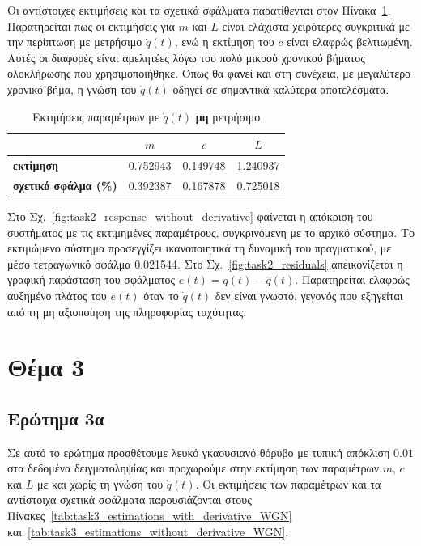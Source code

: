\documentclass[a4paper,12pt]{article}
\begin{document}
Οι αντίστοιχες εκτιμήσεις και τα σχετικά σφάλματα παρατίθενται στον Πίνακα~\ref{tab:task2_estimations_without_derivative}. Παρατηρείται πως οι εκτιμήσεις για $m$ και $L$ είναι ελάχιστα χειρότερες συγκριτικά με την περίπτωση με μετρήσιμο $\dot{q}(t)$, ενώ η εκτίμηση του $c$ είναι ελαφρώς βελτιωμένη. Αυτές οι διαφορές είναι αμελητέες λόγω του πολύ μικρού χρονικού βήματος ολοκλήρωσης που χρησιμοποιήθηκε. Όπως θα φανεί και στη συνέχεια, με μεγαλύτερο χρονικό βήμα, η γνώση του $\dot{q}(t)$ οδηγεί σε σημαντικά καλύτερα αποτελέσματα.

\begin{table}[h!]
\centering
\begin{tabular}{|l|c|c|c|}
\hline
\multicolumn{1}{|c|}{} & \multicolumn{1}{c|}{$m$} & \multicolumn{1}{c|}{$c$} & \multicolumn{1}{c|}{$L$} \\
\hline
\textbf{εκτίμηση} & 0.752943 & 0.149748 & 1.240937 \\
\textbf{σχετικό σφάλμα (\%)} & 0.392387 & 0.167878 & 0.725018 \\
\hline
\end{tabular}
\caption{Εκτιμήσεις παραμέτρων με $\dot{q}(t)$ \textbf{μη} μετρήσιμο}
\label{tab:task2_estimations_without_derivative}
\end{table}

Στο Σχ.~\ref{fig:task2_response_without_derivative} φαίνεται η απόκριση του συστήματος με τις εκτιμημένες παραμέτρους, συγκρινόμενη με το αρχικό σύστημα. Το εκτιμώμενο σύστημα προσεγγίζει ικανοποιητικά τη δυναμική του πραγματικού, με μέσο τετραγωνικό σφάλμα 0.021544. Στο Σχ.~\ref{fig:task2_residuals} απεικονίζεται η γραφική παράσταση του σφάλματος $e(t) = q(t) - \hat{q}(t)$. Παρατηρείται ελαφρώς αυξημένο πλάτος του $e(t)$ όταν το $\dot{q}(t)$ δεν είναι γνωστό, γεγονός που εξηγείται από τη μη αξιοποίηση της πληροφορίας ταχύτητας.

\section*{Θέμα 3}

\subsection*{Ερώτημα 3α}

Σε αυτό το ερώτημα προσθέτουμε λευκό γκαουσιανό θόρυβο με τυπική απόκλιση $0.01$ στα δεδομένα δειγματοληψίας και προχωρούμε στην εκτίμηση των παραμέτρων $m$, $c$ και $L$ με και χωρίς τη γνώση του $\dot{q}(t)$. Οι εκτιμήσεις των παραμέτρων και τα αντίστοιχα σχετικά σφάλματα παρουσιάζονται στους Πίνακες~\ref{tab:task3_estimations_with_derivative_WGN} και~\ref{tab:task3_estimations_without_derivative_WGN}.
\end{document}
